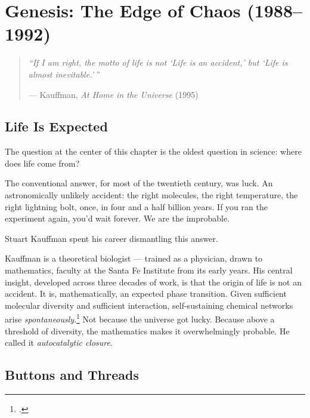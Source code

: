 

\chapter{Genesis: The Edge of Chaos (1988--1992)}
\label{spine:genesis}

\begin{quote}\small\textit{%
``If I am right, the motto of life is not `Life is an accident,' but `Life is almost inevitable.'\,''%
}\par\raggedleft --- Kauffman, \textit{At Home in the Universe} (1995)\end{quote}

\vspace{0.5cm}

\section*{Life Is Expected}
\label{spine:gen-life-is-expected}

The question at the center of this chapter is the oldest question in science: where does life come from?

The conventional answer, for most of the twentieth century, was luck. An astronomically unlikely accident: the right molecules, the right temperature, the right lightning bolt, once, in four and a half billion years. If you ran the experiment again, you'd wait forever. We are the improbable.

Stuart Kauffman spent his career dismantling this answer.

Kauffman is a theoretical biologist --- trained as a physician, drawn to mathematics, faculty at the Santa Fe Institute from its early years. His central insight, developed across three decades of work, is that the origin of life is not an accident. It is, mathematically, an expected phase transition. Given sufficient molecular diversity and sufficient interaction, self-sustaining chemical networks arise \textit{spontaneously}.\footcite{kauffman1993} Not because the universe got lucky. Because above a threshold of diversity, the mathematics makes it overwhelmingly probable. He called it \textit{autocatalytic closure}.

\section*{Buttons and Threads}
\label{spine:gen-buttons-and-threads}

